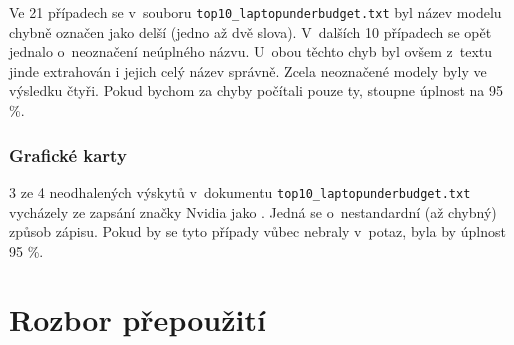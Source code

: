 \documentclass[a4,12pt]{article}
\let\Oldsection\section
\renewcommand{\section}{\FloatBarrier\Oldsection}
\let\Oldsubsubsection\subsubsection
\renewcommand{\subsubsection}{\FloatBarrier\Oldsubsubsection}
\begin{document}
Ve 21 případech se v~souboru \texttt{top10\_laptopunderbudget.txt} byl název modelu chybně označen jako delší (jedno až dvě slova). V~dalších 10 případech se opět jednalo o~neoznačení neúplného názvu. U~obou těchto chyb byl ovšem z~textu jinde extrahován i jejich celý název správně. Zcela neoznačené modely byly ve výsledku čtyři. Pokud bychom za chyby počítali pouze ty, stoupne úplnost na 95 \%.

\subsubsection{Grafické karty}
3 ze 4 neodhalených výskytů v~dokumentu \texttt{top10\_laptopunderbudget.txt} vycházely ze zapsání značky Nvidia jako . Jedná se o~nestandardní (až chybný) způsob zápisu. Pokud by se tyto případy vůbec nebraly v~potaz, byla by úplnost 95 \%.
\section{Rozbor přepoužití}
\end{document}

